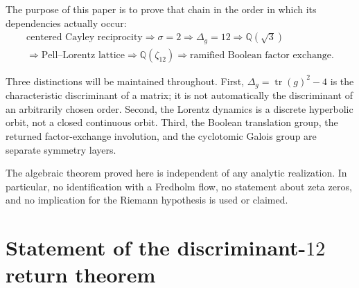\documentclass[11pt]{article}
\theoremstyle{definition}
\theoremstyle{remark}
\newcommand{\Q}{\mathbb Q}
\newcommand{\tr}{\operatorname{tr}}
\begin{document}
The purpose of this paper is to prove that chain in the order in which its
dependencies actually occur:
\[
\boxed{
\begin{gathered}
\text{centered Cayley reciprocity}
\Longrightarrow \sigma=2
\Longrightarrow \Delta_g=12
\Longrightarrow \Q(\sqrt3)\\
\Longrightarrow \text{Pell--Lorentz lattice}
\Longrightarrow \Q(\zeta_{12})
\Longrightarrow \text{ramified Boolean factor exchange}.
\end{gathered}}
\]

Three distinctions will be maintained throughout.  First,
$\Delta_g=\tr(g)^2-4$ is the characteristic discriminant of a matrix; it is
not automatically the discriminant of an arbitrarily chosen order.  Second,
the Lorentz dynamics is a discrete hyperbolic orbit, not a closed continuous
orbit.  Third, the Boolean translation group, the returned factor-exchange
involution, and the cyclotomic Galois group are separate symmetry layers.

The algebraic theorem proved here is independent of any analytic realization.
In particular, no identification with a Fredholm flow, no statement about
zeta zeros, and no implication for the Riemann hypothesis is used or claimed.

\section{Statement of the discriminant-$12$ return theorem}
\end{document}
